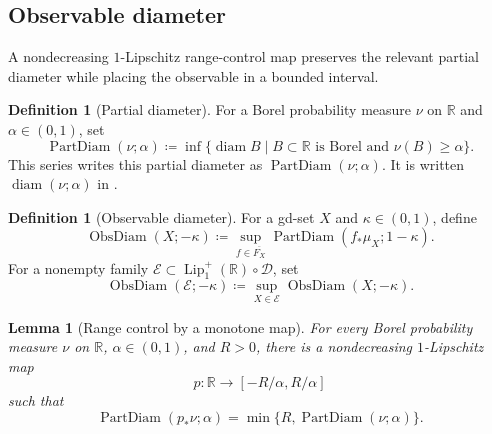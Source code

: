 \documentclass{amsart}
\theoremstyle{plain}
\newtheorem{lemma}[theorem]{Lemma}
\theoremstyle{definition}
\newtheorem{definition}[theorem]{Definition}
\theoremstyle{remark}
\newcommand{\R}{\mathbb{R}}
\newcommand{\D}{\mathcal{D}}
\newcommand{\Lup}{\operatorname{Lip}^{+}_{1}(\R)}
\DeclareMathOperator{\pd}{PartDiam}
\DeclareMathOperator{\od}{ObsDiam}
\begin{document}
\subsection{Observable diameter}
\label{sec:observable-diameter}

A nondecreasing $1$-Lipschitz range-control map preserves the relevant
partial diameter while placing the observable in a bounded interval.

\begin{definition}[Partial diameter]
\label{def:real-line-feature-invariants}
For a Borel probability measure $\nu$ on $\R$ and $\alpha\in(0,1)$, set
\[
\pd(\nu;\alpha)\coloneqq
\inf\{\operatorname{diam}B\mid B\subset\R\text{ is Borel and }
\nu(B)\geq\alpha\}.
\]
This series writes this partial diameter as
$\operatorname{PartDiam}(\nu;\alpha)$.  It is written
$\operatorname{diam}(\nu;\alpha)$ in \cite{shioya2016mmg}.
\end{definition}

\begin{definition}[Observable diameter]
\label{def:gds-feature-invariants}
\label{def:gds-observable-diameter}
For a gd-set $X$ and $\kappa\in(0,1)$, define
\[ \od(X;-\kappa)\coloneqq \sup_{f\in\overline{F_X}}\pd(f_*\mu_X;1-\kappa). \]
For a nonempty family $\mathcal E\subset\Lup\circ\D$, set
\[ \od(\mathcal E;-\kappa)\coloneqq \sup_{X\in\mathcal E}\od(X;-\kappa). \]
\end{definition}

\begin{lemma}[Range control by a monotone map]
\label{lem:monotone-real-range-control}
For every Borel probability measure $\nu$ on $\R$, $\alpha\in(0,1)$, and
$R>0$, there is a nondecreasing $1$-Lipschitz map
\[
p\colon\R\longrightarrow[-R/\alpha,R/\alpha]
\]
such that
\[
\pd(p_*\nu;\alpha)=\min\{R,\pd(\nu;\alpha)\}.
\]
\end{lemma}
\end{document}

